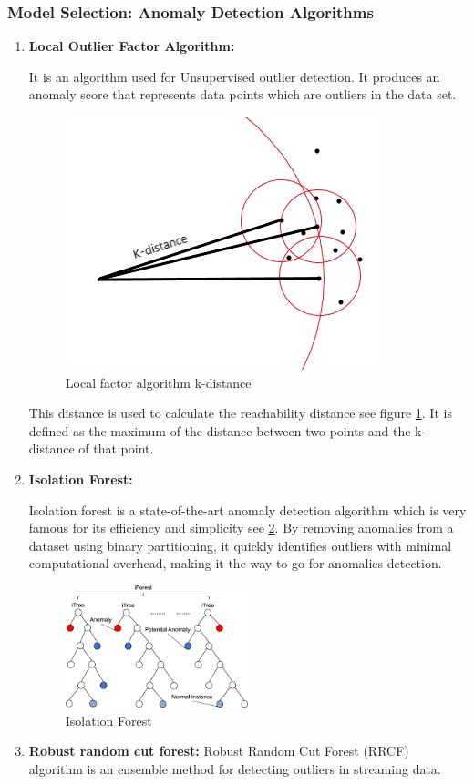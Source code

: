 \documentclass[12pt]{report}
\begin{document}
\subsubsection{Model Selection: Anomaly Detection Algorithms}
\begin{enumerate}
  \item  \textbf{Local Outlier Factor Algorithm:}
  \par
 It  is an algorithm used for Unsupervised outlier detection. It produces an anomaly score that represents data points which are outliers in the data set.
\begin{figure}[h]
    \includegraphics[width=0.5\linewidth]{lof.png}
    \caption{Local factor  algorithm k-distance}
    \label{fig:lof}
\end{figure}
\par
 This distance is used to calculate the reachability distance see figure \ref{fig:lof}. It is defined as the maximum of the distance between two points and the k-distance of that point.
\item  \textbf{Isolation Forest:}
\par
Isolation forest is a state-of-the-art anomaly detection algorithm which is very famous for its efficiency and simplicity see \ref{fig:iso}. By removing anomalies from a dataset using binary partitioning, it quickly identifies outliers with minimal computational overhead, making it the way to go for anomalies detection.
\begin{figure}[h]
    \includegraphics[width=0.5\textwidth]{iso.png}
    \caption{Isolation Forest}
    \label{fig:iso}
\end{figure}
\item \textbf{Robust
random cut forest:}
Robust Random Cut Forest (RRCF) algorithm is an ensemble method for detecting outliers in streaming data.
\end{enumerate}
\end{document}
